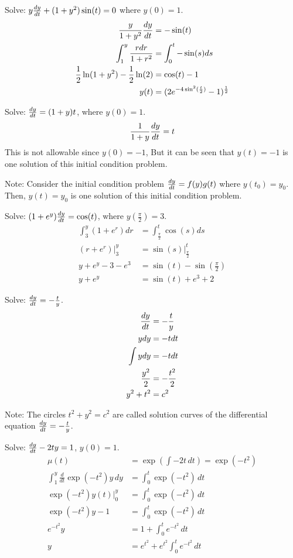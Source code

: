 \documentclass[12pt]{article}
\begin{document}
\begin{example} Solve: $y\frac{dy}{dt} + (1 + y^2)\sin(t) = 0$ where $y(0) = 1$. $$\begin{aligned} \frac{y}{1 + y^2}\frac{dy}{dt} &= -\sin(t) \\ \int_1^y \frac{rdr}{1 + r^2} &= \int_0^t -\sin(s)ds \\ \frac{1}{2}\ln(1 + y^2) - \frac{1}{2}\ln(2) &= \cos(t) - 1 \\ y(t) &= (2e^{-4\sin^2(\frac{t}{2})} - 1)^{\frac{1}{2}} \end{aligned} $$ \end{example} 
\begin{example} Solve: $\frac{dy}{dt} = (1 + y)t$, where $y(0) = 1$. 
$$\frac{1}{1 + y}\frac{dy}{dt} = t $$ This is not allowable since $y(0) = -1$, But it can be seen that $y(t) = -1$ is one solution of this initial condition problem. \end{example}
Note: Consider the initial condition problem $\frac{dy}{dt} = f(y)g(t)$ where $y(t_0) = y_0$. Then, $y(t) = y_0$ is one solution of this initial condition problem. 
\begin{example} Solve: $(1 + e^y)\frac{dy}{dt} = \cos(t)$, where $y(\frac{\pi}{2}) = 3$. $$\begin{aligned} \int_3^y (1 + e^r)dr &= \int_{\frac{\pi}{2}}^t \cos(s)ds \\ (r + e^r)\Big|_3^y &= \sin(s)\Big|_{\frac{\pi}{2}}^t \\ y + e^y - 3 - e^3 &= \sin(t) - \sin(\frac{\pi}{2}) \\ y + e^y &= \sin(t) + e^3 + 2 \end{aligned} $$ \end{example} 
\begin{example} Solve: $\frac{dy}{dt} = -\frac{t}{y}$. $$\begin{aligned} \frac{dy}{dt} &= -\frac{t}{y} \\ ydy &= -tdt \\ \int ydy &= -tdt \\ \frac{y^2}{2} &= -\frac{t^2}{2} \\ y^2 + t^2 &= c^2 \end{aligned} $$ \end{example} 
Note: The circles $t^2 + y^2 = c^2$ are called solution curves of the differential equation $\frac{dy}{dt} = -\frac{t}{y}$. 
\begin{example} Solve: $\frac{dy}{dt} - 2ty = 1$, $y(0) = 1$. $$\begin{aligned} 
\mu(t) &= \exp(\int -2t \, dt) = \exp(-t^2) \\ \int_1^y \frac{d}{dt} \exp(-t^2)y \, dy &= \int_0^t \exp(-t^2) \, dt \\ 
\exp(-t^2)y(t)\Big|_0^y &= \int_0^t \exp(-t^2) \, dt \\ \exp(-t^2)y - 1 &= \int_0^t \exp(-t^2)\, dt \\ e^{-t^2}y &= 1 + \int_0^t e^{-t^2} \, dt \\ y &= e^{t^2} + e^{t^2}\int_0^t e^{-t^2} \, dt \end{aligned} $$ \end{example}
\end{document}

